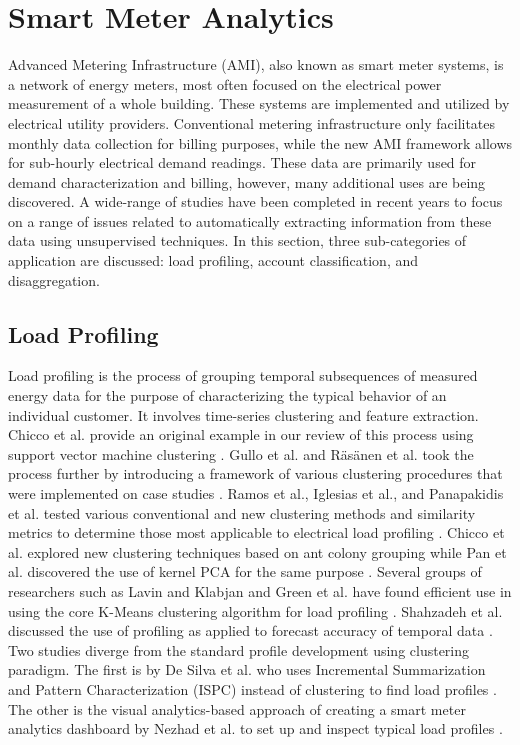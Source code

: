 \section{Smart Meter Analytics}
\label{SmartMeter}
Advanced Metering Infrastructure (AMI), also known as smart meter systems, is a network of energy meters, most often focused on the electrical power measurement of a whole building. These systems are implemented and utilized by electrical utility providers. Conventional metering infrastructure only facilitates monthly data collection for billing purposes, while the new AMI framework allows for sub-hourly electrical demand readings. These data are primarily used for demand characterization and billing, however, many additional uses are being discovered. A wide-range of studies have been completed in recent years to focus on a range of issues related to automatically extracting information from these data using unsupervised techniques. In this section, three sub-categories of application are discussed: load profiling, account classification, and disaggregation.

\subsection{Load Profiling}
Load profiling is the process of grouping temporal subsequences of measured energy data for the purpose of characterizing the typical behavior of an individual customer. It involves time-series clustering and feature extraction. Chicco et al. provide an original example in our review of this process using support vector machine clustering \citep{chicco_support_2009}. Gullo et al. and R\"as\"anen et al. took the process further by introducing a framework of various clustering procedures that were implemented on case studies \citep{gullo_low-voltage_2009,rasanen_feature-based_2009}. Ramos et al., Iglesias et al., and Panapakidis et al. tested various conventional and new clustering methods and similarity metrics to determine those most applicable to electrical load profiling \citep{iglesias_analysis_2013,ramos_typical_2012,panapakidis_evaluation_2015}. Chicco et al. explored new clustering techniques based on ant colony grouping while Pan et al. discovered the use of kernel PCA for the same purpose \citep{chicco_electrical_2013,pan_kernel-based_2015}. Several groups of researchers such as Lavin and Klabjan and Green et al. have found efficient use in using the core K-Means clustering algorithm for load profiling \citep{lavin_clustering_2014,green_divide_2014}. Shahzadeh et al. discussed the use of profiling as applied to forecast accuracy of temporal data \citep{shahzadeh_improving_2015}. Two studies diverge from the standard profile development using clustering paradigm. The first is by De Silva et al. who uses Incremental Summarization and Pattern Characterization (ISPC) instead of clustering to find load profiles \citep{de_silva_data_2011}. The other is the visual analytics-based approach of creating a smart meter analytics dashboard by Nezhad et al. to set up and inspect typical load profiles \citep{jarrah_nezhad_smartd:_2014}.

